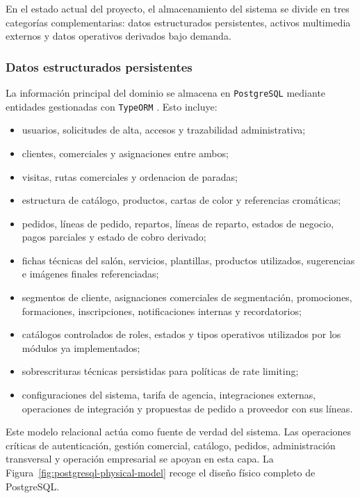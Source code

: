En el estado actual del proyecto, el almacenamiento del sistema se divide en tres categorías complementarias: datos estructurados persistentes, activos multimedia externos y datos operativos derivados bajo demanda.

\subsubsection*{Datos estructurados persistentes}

La información principal del dominio se almacena en \texttt{PostgreSQL} mediante entidades gestionadas con \texttt{TypeORM} \citep{postgresdocs2026,typeormentities2026}. Esto incluye:

\begin{itemize}
    \item usuarios, solicitudes de alta, accesos y trazabilidad administrativa;
    \item clientes, comerciales y asignaciones entre ambos;
    \item visitas, rutas comerciales y ordenacion de paradas;
    \item estructura de catálogo, productos, cartas de color y referencias cromáticas;
    \item pedidos, líneas de pedido, repartos, líneas de reparto, estados de negocio, pagos parciales y estado de cobro derivado;
    \item fichas técnicas del salón, servicios, plantillas, productos utilizados, sugerencias e imágenes finales referenciadas;
    \item segmentos de cliente, asignaciones comerciales de segmentación, promociones, formaciones, inscripciones, notificaciones internas y recordatorios;
    \item catálogos controlados de roles, estados y tipos operativos utilizados por los módulos ya implementados;
    \item sobrescrituras técnicas persistidas para políticas de rate limiting;
    \item configuraciones del sistema, tarifa de agencia, integraciones externas, operaciones de integración y propuestas de pedido a proveedor con sus líneas.
\end{itemize}

Este modelo relacional actúa como fuente de verdad del sistema. Las operaciones críticas de autenticación, gestión comercial, catálogo, pedidos, administración transversal y operación empresarial se apoyan en esta capa. La Figura~\ref{fig:postgresql-physical-model} recoge el diseño físico completo de PostgreSQL.

